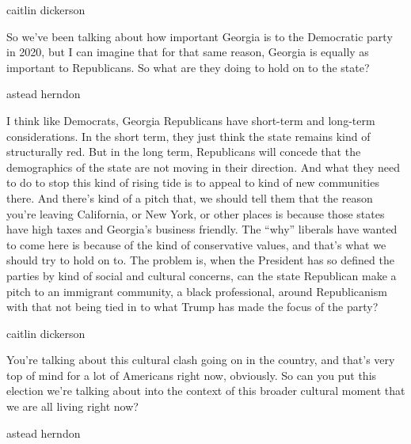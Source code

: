 caitlin dickerson

So we've been talking about how important Georgia is to the Democratic
party in 2020, but I can imagine that for that same reason, Georgia is
equally as important to Republicans. So what are they doing to hold on
to the state?

astead herndon

I think like Democrats, Georgia Republicans have short-term and
long-term considerations. In the short term, they just think the state
remains kind of structurally red. But in the long term, Republicans will
concede that the demographics of the state are not moving in their
direction. And what they need to do to stop this kind of rising tide is
to appeal to kind of new communities there. And there's kind of a pitch
that, we should tell them that the reason you're leaving California, or
New York, or other places is because those states have high taxes and
Georgia's business friendly. The ``why'' liberals have wanted to come
here is because of the kind of conservative values, and that's what we
should try to hold on to. The problem is, when the President has so
defined the parties by kind of social and cultural concerns, can the
state Republican make a pitch to an immigrant community, a black
professional, around Republicanism with that not being tied in to what
Trump has made the focus of the party?

caitlin dickerson

You're talking about this cultural clash going on in the country, and
that's very top of mind for a lot of Americans right now, obviously. So
can you put this election we're talking about into the context of this
broader cultural moment that we are all living right now?

astead herndon

